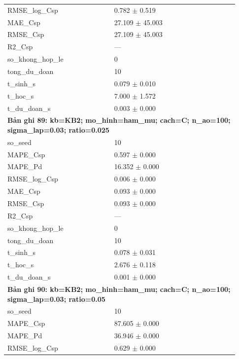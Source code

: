 \begin{longtable}{p{0.43\linewidth}p{0.50\linewidth}}
RMSE\_\allowbreak log\_\allowbreak Csp & 0.782 $\pm$ 0.519 \\
MAE\_\allowbreak Csp & 27.109 $\pm$ 45.003 \\
RMSE\_\allowbreak Csp & 27.109 $\pm$ 45.003 \\
R2\_\allowbreak Csp & — \\
so\_\allowbreak khong\_\allowbreak hop\_\allowbreak le & 0 \\
tong\_\allowbreak du\_\allowbreak doan & 10 \\
t\_\allowbreak sinh\_\allowbreak s & 0.079 $\pm$ 0.010 \\
t\_\allowbreak hoc\_\allowbreak s & 7.000 $\pm$ 1.572 \\
t\_\allowbreak du\_\allowbreak doan\_\allowbreak s & 0.003 $\pm$ 0.000 \\
\midrule
\multicolumn{2}{p{0.95\linewidth}}{\textbf{Bản ghi 89: kb=KB2; mo\_hinh=ham\_mu; cach=C; n\_ao=100; sigma\_lap=0.03; ratio=0.025}} \\
so\_\allowbreak seed & 10 \\
MAPE\_\allowbreak Csp & 0.597 $\pm$ 0.000 \\
MAPE\_\allowbreak Pd & 16.352 $\pm$ 0.000 \\
RMSE\_\allowbreak log\_\allowbreak Csp & 0.006 $\pm$ 0.000 \\
MAE\_\allowbreak Csp & 0.093 $\pm$ 0.000 \\
RMSE\_\allowbreak Csp & 0.093 $\pm$ 0.000 \\
R2\_\allowbreak Csp & — \\
so\_\allowbreak khong\_\allowbreak hop\_\allowbreak le & 0 \\
tong\_\allowbreak du\_\allowbreak doan & 10 \\
t\_\allowbreak sinh\_\allowbreak s & 0.078 $\pm$ 0.031 \\
t\_\allowbreak hoc\_\allowbreak s & 2.676 $\pm$ 0.118 \\
t\_\allowbreak du\_\allowbreak doan\_\allowbreak s & 0.001 $\pm$ 0.000 \\
\midrule
\multicolumn{2}{p{0.95\linewidth}}{\textbf{Bản ghi 90: kb=KB2; mo\_hinh=ham\_mu; cach=C; n\_ao=100; sigma\_lap=0.03; ratio=0.05}} \\
so\_\allowbreak seed & 10 \\
MAPE\_\allowbreak Csp & 87.605 $\pm$ 0.000 \\
MAPE\_\allowbreak Pd & 36.946 $\pm$ 0.000 \\
RMSE\_\allowbreak log\_\allowbreak Csp & 0.629 $\pm$ 0.000 \\

\end{longtable}
